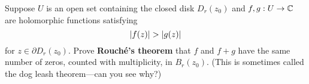 \documentclass{homework}
\begin{document}
                                                                                                                                   \begin{problem}\label{rouches-theorem}Suppose $U$ is an open set containing the closed disk $D_r(z_0)$ and
                                                                                                                                     $f, g : U \to \mathbb{C}$ are holomorphic functions satisfying
                                                                                                                                       \[
                                                                                                                                           \left|f(z)\right| > \left|g(z)\right|
                                                                                                                                             \]
                                                                                                                                               for $z \in \partial D_r(z_0)$.  Prove \textbf{Rouch\'e's theorem}
                                                                                                                                                 that $f$ and $f+g$ have the same number of zeros, counted with
                                                                                                                                                   multiplicity, in $B_r(z_0)$.  (This is sometimes called the dog
                                                                                                                                                     leash theorem---can you see why?)
                                                                                                                                                     \end{problem}
\end{document}

